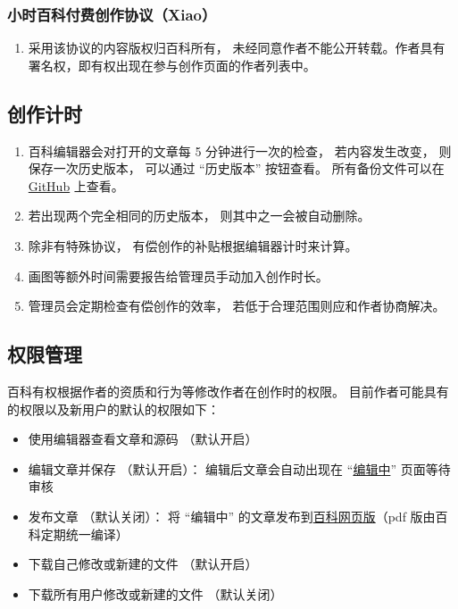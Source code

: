 \subsubsection{小时百科付费创作协议（Xiao）}
\begin{enumerate}
\item 采用该协议的内容版权归百科所有， 未经同意作者不能公开转载。作者具有署名权，即有权出现在参与创作页面的作者列表中。
\end{enumerate}

\subsection{创作计时}
\begin{enumerate}
\item 百科编辑器会对打开的文章每 5 分钟进行一次的检查， 若内容发生改变， 则保存一次历史版本， 可以通过 “历史版本” 按钮查看。 所有备份文件可以在 \href{https://github.com/MacroUniverse/PhysWiki-backup}{GitHub} 上查看。
\item 若出现两个完全相同的历史版本， 则其中之一会被自动删除。
\item 除非有特殊协议， 有偿创作的补贴根据编辑器计时来计算。
\item 画图等额外时间需要报告给管理员手动加入创作时长。
\item 管理员会定期检查有偿创作的效率， 若低于合理范围则应和作者协商解决。
\end{enumerate}

\subsection{权限管理}
百科有权根据作者的资质和行为等修改作者在创作时的权限。 目前作者可能具有的权限以及新用户的默认的权限如下：
\begin{itemize}
\item 使用编辑器查看文章和源码 （默认开启）
\item 编辑文章并保存 （默认开启）： 编辑后文章会自动出现在 “\href{https://wuli.wiki/changed}{编辑中}” 页面等待审核
\item 发布文章 （默认关闭）： 将 “编辑中” 的文章发布到\href{https://wuli.wiki/online}{百科网页版}（pdf 版由百科定期统一编译）
\item 下载自己修改或新建的文件 （默认开启）
\item 下载所有用户修改或新建的文件 （默认关闭）
\end{itemize}
